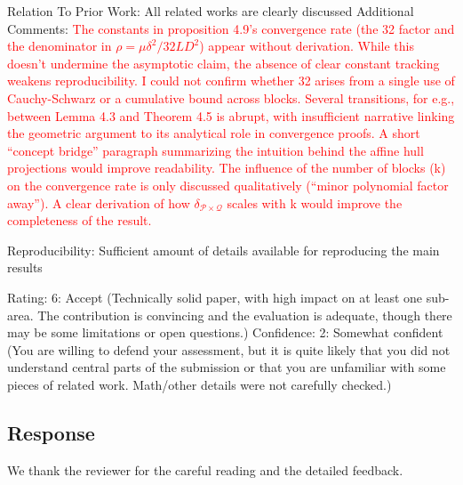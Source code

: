 \documentclass[a4wide]{article}
\begin{document}
Relation To Prior Work: All related works are clearly discussed
Additional Comments: \textcolor{red}{The constants in proposition 4.9's convergence rate (the 32 factor and the denominator in  $\rho = \mu \delta^2 / 32 L D^2$) appear without derivation. While this doesn't undermine the asymptotic claim, the absence of clear constant tracking weakens reproducibility. I could not confirm whether 32 arises from a single use of Cauchy-Schwarz or a cumulative bound across blocks.
Several transitions, for e.g., between Lemma 4.3 and Theorem 4.5 is abrupt, with insufficient narrative linking the geometric argument to its analytical role in convergence proofs. A short “concept bridge” paragraph summarizing the intuition behind the affine hull projections would improve readability.
The influence of the number of blocks (k) on the convergence rate is only discussed qualitatively (“minor polynomial factor away”). A clear derivation of how $\delta_{\mathcal{P} \times \mathcal{Q}}$  scales with k would improve the completeness of the result.}

Reproducibility: Sufficient amount of details available for reproducing the main results

Rating: 6: Accept (Technically solid paper, with high impact on at least one sub-area. The contribution is convincing and the evaluation is adequate, though there may be some limitations or open questions.)
Confidence: 2: Somewhat confident (You are willing to defend your assessment, but it is quite likely that you did not understand central parts of the submission or that you are unfamiliar with some pieces of related work. Math/other details were not carefully checked.)


\subsection*{Response}

We thank the reviewer for the careful reading and the detailed feedback.
\end{document}
